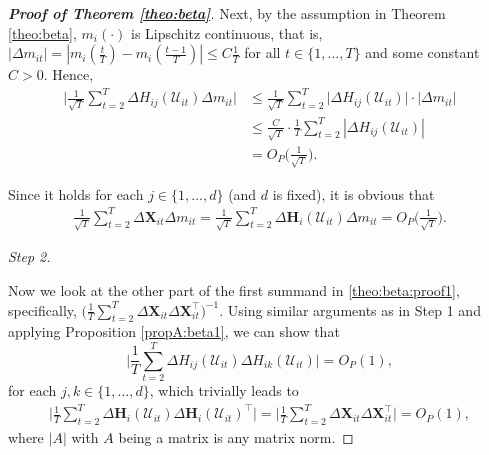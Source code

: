 \begin{proof}[\textnormal{\textbf{Proof of Theorem \ref{theo:beta}}}]
Next, by the assumption in Theorem \ref{theo:beta}, $m_i(\cdot)$ is Lipschitz continuous, that is,  \linebreak $|\Delta m_{it}| = \left|m_i \left( \frac{t}{T} \right) - m_i \left(\frac{t-1}{T}\right) \right| \leq C \frac{1}{T}$ for all $t \in \{1, \ldots, T\}$ and some constant $C > 0$. Hence, 
\begin{align*}
\Big| \frac{1}{\sqrt{T}}\sum_{t=2}^T \Delta  H_{ij} (\mathcal{U}_{it})\Delta m_{it}\Big| &\leq \frac{1}{\sqrt{T}}\sum_{t=2}^T \big|\Delta  H_{ij} (\mathcal{U}_{it})\big| \cdot \big| \Delta m_{it} \big| \\
	& \leq \frac{C}{\sqrt{T}} \cdot \frac{1}{T} \sum_{t=2}^T \left|\Delta  H_{ij} (\mathcal{U}_{it})\right|\\
& = O_P\Big(\frac{1}{\sqrt{T}}\Big).
\end{align*}

Since it holds for each $j\in\{1, \ldots, d\}$ (and $d$ is fixed), it is obvious that
\begin{align}\label{theo-regs-proof-6}
\frac{1}{\sqrt{T}}\sum_{t=2}^T \Delta \mathbf{X}_{it} \Delta m_{it}  =\frac{1}{\sqrt{T}}\sum_{t=2}^T \Delta  \mathbf{H}_i (\mathcal{U}_{it})\Delta m_{it}= O_P\Big(\frac{1}{\sqrt{T}}\Big).
\end{align}

{\it Step 2.}

Now we look at the other part of the first summand in \eqref{theo:beta:proof1}, specifically, \linebreak $ \big(\frac{1}{T}\sum_{t=2}^T\Delta \mathbf{X}_{it} \Delta \mathbf{X}_{it}^\top\big)^{-1}$. Using similar arguments as in Step 1 and applying Proposition \ref{propA:beta1}, we can show that 
\[  \Big|\frac{1}{T}\sum_{t=2}^T \Delta H_{ij}(\mathcal{U}_{it}) \Delta H_{ik}(\mathcal{U}_{it})\Big| = O_P(1),
\]
for each $j, k\in\{1, \ldots, d\}$, which trivially leads to 
\begin{align*}
\Big| \frac{1}{T}\sum_{t=2}^T \Delta \mathbf{H}_i (\mathcal{U}_{it})\Delta \mathbf{H}_i (\mathcal{U}_{it})^\top \Big| =\Big|\frac{1}{T}\sum_{t=2}^T\Delta \mathbf{X}_{it} \Delta \mathbf{X}_{it}^\top\Big| = O_P(1),
\end{align*}
where $|A|$ with $A$ being a matrix is any matrix norm.


\end{proof}
